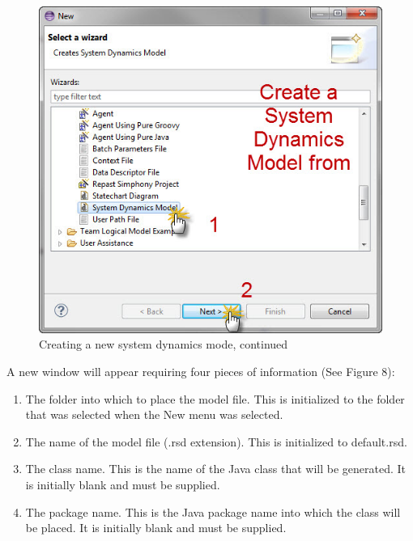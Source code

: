 \documentclass[11pt]{amsart}
\begin{document}
\begin{figure}[ht]
\begin{center}
\vspace{.2in}
\centerline {
\includegraphics[totalheight=0.35\textheight]{images/007.jpg}
}
\caption{Creating a new system dynamics mode, continued}
\label{fig:007}
\end{center}
\end{figure}

A new window will appear requiring four pieces of information (See Figure 8):

\begin{enumerate}
\item The folder into which to place the model file. This is initialized to the folder that was selected when the New menu was selected.
\item The name of the model file (.rsd extension). This is initialized to default.rsd.
\item The class name. This is the name of the Java class that will be generated. It is initially blank and must be supplied.
\item The package name. This is the Java package name into which the class will be placed. It is initially blank and must be supplied.
\end{enumerate}
\vspace{.2in}
\end{document}
